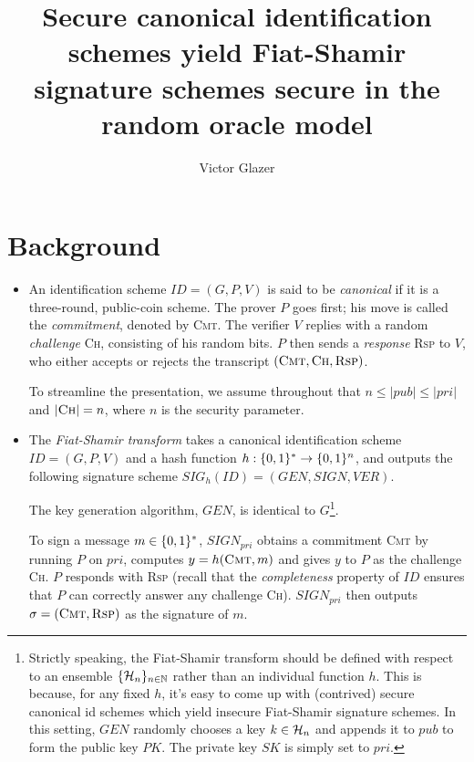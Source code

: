 \documentclass[12pt,twoside]{article}
\title{Secure canonical identification schemes yield Fiat-Shamir signature
schemes secure in the random oracle model}
\author{Victor Glazer}
\begin{document}
\maketitle
\section*{Background}
\begin{itemize}
\item An identification scheme $ID = (G,P,V)$ is said to be \emph{canonical} 
if it is a three-round, public-coin scheme. The prover $P$ goes first; his 
move is called the \emph{commitment}, denoted by \textsc{Cmt}. The verifier 
$V$ replies with a random \emph{challenge} \textsc{Ch}, consisting of his 
random bits. $P$ then sends a \emph{response} \textsc{Rsp} to $V$, who either 
accepts or rejects the transcript $(\textsc{Cmt},\textsc{Ch},\textsc{Rsp})$. 

\begin{rem}
To streamline the presentation, we assume throughout that $n \leq |pub| 
\leq |pri|$ and $|\textsc{Ch}| = n$, where $n$ is the security parameter.
\end{rem}

\item The \emph{Fiat-Shamir transform} takes a canonical identification scheme 
$ID = (G,P,V)$ and a hash function $h: \{0,1\}^{*} \to \{0,1\}^{n}$, and outputs the
following signature scheme $SIG_h(ID) = (GEN, SIGN, VER)$. 

\medskip\noindent
The key generation algorithm, $GEN$, is identical to $G$\footnote{Strictly 
speaking, the Fiat-Shamir transform should be defined with respect to an 
ensemble $\{\mathcal{H}_n\}_{n \in \mathbb{N}}$ rather than an individual function $h$. This is 
because, for any fixed $h$, it's easy to come up with (contrived) secure 
canonical id schemes which yield insecure Fiat-Shamir signature schemes. In 
this setting, $GEN$ randomly chooses a key $k \in \mathcal{H}_n$ and appends it 
to $pub$ to form the public key $PK$. The private key $SK$ is simply set to 
$pri$.}. 

\medskip\noindent
To sign a message $m \in \{0,1\}^{*}$, $SIGN_{pri}$ obtains a commitment
\textsc{Cmt} by running $P$ on $pri$, computes $y = h(\textsc{Cmt},m)$ and 
gives $y$ to $P$ as the challenge \textsc{Ch}. $P$ responds with \textsc{Rsp}
(recall that the \emph{completeness} property of $ID$ ensures that $P$ can
correctly answer any challenge \textsc{Ch}). $SIGN_{pri}$ then outputs 
$\sigma = (\textsc{Cmt},\textsc{Rsp})$ as the signature of $m$. 


\end{itemize}
\end{document}
